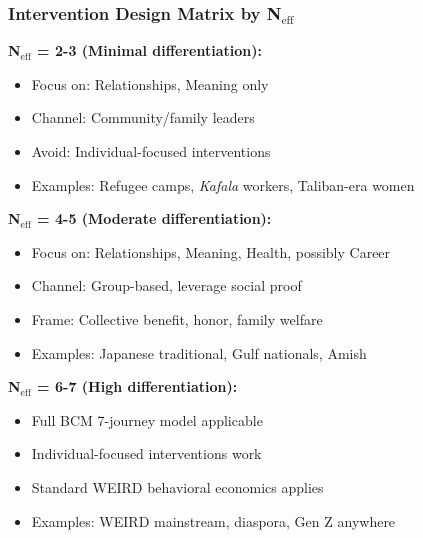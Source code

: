 \subsubsection{Intervention Design Matrix by N$_{\text{eff}}$}

\begin{tcolorbox}[colback=blue!5!white, colframe=blue!75!black, title=Practitioner Guidance: Intervention Strategy by Domain Count]

\textbf{N$_{\text{eff}}$ = 2-3 (Minimal differentiation):}
\begin{itemize}[nosep]
\item Focus on: Relationships, Meaning only
\item Channel: Community/family leaders
\item Avoid: Individual-focused interventions
\item Examples: Refugee camps, \textit{Kafala} workers, Taliban-era women
\end{itemize}

\textbf{N$_{\text{eff}}$ = 4-5 (Moderate differentiation):}
\begin{itemize}[nosep]
\item Focus on: Relationships, Meaning, Health, possibly Career
\item Channel: Group-based, leverage social proof
\item Frame: Collective benefit, honor, family welfare
\item Examples: Japanese traditional, Gulf nationals, Amish
\end{itemize}

\textbf{N$_{\text{eff}}$ = 6-7 (High differentiation):}
\begin{itemize}[nosep]
\item Full BCM 7-journey model applicable
\item Individual-focused interventions work
\item Standard WEIRD behavioral economics applies
\item Examples: WEIRD mainstream, diaspora, Gen Z anywhere
\end{itemize}

\end{tcolorbox}



